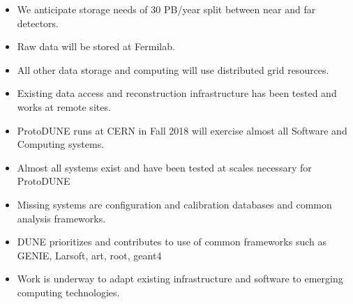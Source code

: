 \begin{itemize}
\item We anticipate storage needs of 30 PB/year split between near and far detectors.
\item Raw data will be stored at Fermilab.
\item All other data storage and computing will use distributed grid resources.
\item Existing data access and reconstruction infrastructure has been tested and works at remote sites. 
\item ProtoDUNE runs at CERN in Fall 2018 will exercise almost all Software and Computing systems. 
\item Almost all systems exist and have been tested at scales necessary for ProtoDUNE
\item Missing systems are configuration and calibration databases and common analysis frameworks.
\item DUNE prioritizes and contributes to use of common frameworks such as GENIE, Larsoft, art, root, geant4 
\item Work is underway to adapt existing infrastructure and software to emerging computing technologies. 
\end{itemize}
%
%
